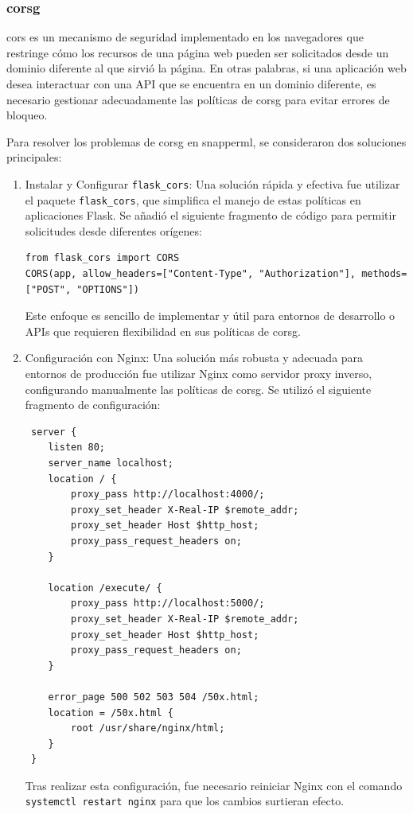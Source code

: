 \subsubsection{\Gls{corsg}}
\acrfull{cors} es un mecanismo de seguridad implementado en los navegadores que restringe cómo los recursos de una página web pueden ser solicitados desde un dominio diferente al que sirvió la página. En otras palabras, si una aplicación web desea interactuar con una API que se encuentra en un dominio diferente, es necesario gestionar adecuadamente las políticas de \Gls{corsg} para evitar errores de bloqueo.

Para resolver los problemas de \Gls{corsg} en \Gls{snapperml}, se consideraron dos soluciones principales:
\begin{enumerate}
    \item Instalar y Configurar \texttt{flask\_cors}: Una solución rápida y efectiva fue utilizar el paquete \texttt{flask\_cors}, que simplifica el manejo de estas políticas en aplicaciones Flask. Se añadió el siguiente fragmento de código para permitir solicitudes desde diferentes orígenes:
          \begin{verbatim} 
from flask_cors import CORS
CORS(app, allow_headers=["Content-Type", "Authorization"], methods=["POST", "OPTIONS"]) 
    \end{verbatim}
          Este enfoque es sencillo de implementar y útil para entornos de desarrollo o APIs que requieren flexibilidad en sus políticas de \Gls{corsg}.

    \item Configuración con Nginx: Una solución más robusta y adecuada para entornos de producción fue utilizar Nginx como servidor proxy inverso, configurando manualmente las políticas de \Gls{corsg}. Se utilizó el siguiente fragmento de configuración:
          \begin{verbatim} 
 server { 
    listen 80; 
    server_name localhost;
    location / {
        proxy_pass http://localhost:4000/;
        proxy_set_header X-Real-IP $remote_addr;
        proxy_set_header Host $http_host;
        proxy_pass_request_headers on;
    }
    
    location /execute/ {
        proxy_pass http://localhost:5000/;
        proxy_set_header X-Real-IP $remote_addr;
        proxy_set_header Host $http_host;
        proxy_pass_request_headers on;
    }
    
    error_page 500 502 503 504 /50x.html;
    location = /50x.html {
        root /usr/share/nginx/html;
    }
 }
    \end{verbatim}
          Tras realizar esta configuración, fue necesario reiniciar Nginx con el comando \texttt{systemctl restart nginx} para que los cambios surtieran efecto.
\end{enumerate}

